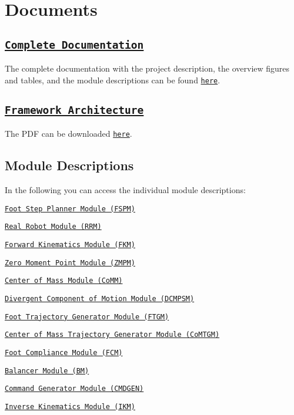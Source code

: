 \section*{Documents }

\subsection*{\href{../pdf/MainDocument.pdf}{\tt Complete Documentation} }

The complete documentation with the project description, the overview figures and tables, and the module descriptions can be found \href{../pdf/MainDocument.pdf}{\tt here}.

\subsection*{\href{../pdf/fullSystem4.pdf}{\tt Framework Architecture} }

The P\+DF can be downloaded \href{../pdf/fullSystem4.pdf}{\tt here}.



\subsection*{Module Descriptions }

In the following you can access the individual module descriptions\+:


\begin{DoxyItemize}
\item \href{../pdf/ModuleDescriptions/01-FootStepPlanner.pdf}{\tt Foot Step Planner Module (F\+S\+PM)}
\item \href{../pdf/ModuleDescriptions/02-RealRobot.pdf}{\tt Real Robot Module (R\+RM)}
\item \href{../pdf/ModuleDescriptions/03-ForwardKinematics.pdf}{\tt Forward Kinematics Module (F\+KM)}
\item \href{../pdf/ModuleDescriptions/04-ZeroMomentPoint.pdf}{\tt Zero Moment Point Module (Z\+M\+PM)}
\item \href{../pdf/ModuleDescriptions/05-CenterOfMass.pdf}{\tt Center of Mass Module (Co\+MM)}
\item \href{../pdf/ModuleDescriptions/06-DCMP.pdf}{\tt Divergent Component of Motion Module (D\+C\+M\+P\+SM)}
\item \href{../pdf/ModuleDescriptions/07-FootTrajectoryPlanner.pdf}{\tt Foot Trajectory Generator Module (F\+T\+GM)}
\item \href{../pdf/ModuleDescriptions/08-COMTG.pdf}{\tt Center of Mass Trajectory Generator Module (Co\+M\+T\+GM)}
\item \href{../pdf/ModuleDescriptions/09-FootCompliantModule.pdf}{\tt Foot Compliance Module (F\+CM)}
\item \href{../pdf/ModuleDescriptions/10-Balancer.pdf}{\tt Balancer Module (BM)}
\item \href{../pdf/ModuleDescriptions/11-CommandGenerator.pdf}{\tt Command Generator Module (C\+M\+D\+G\+EN)}
\item \href{../pdf/ModuleDescriptions/12-InverseKinematics.pdf}{\tt Inverse Kinematics Module (I\+KM)}
\end{DoxyItemize}


